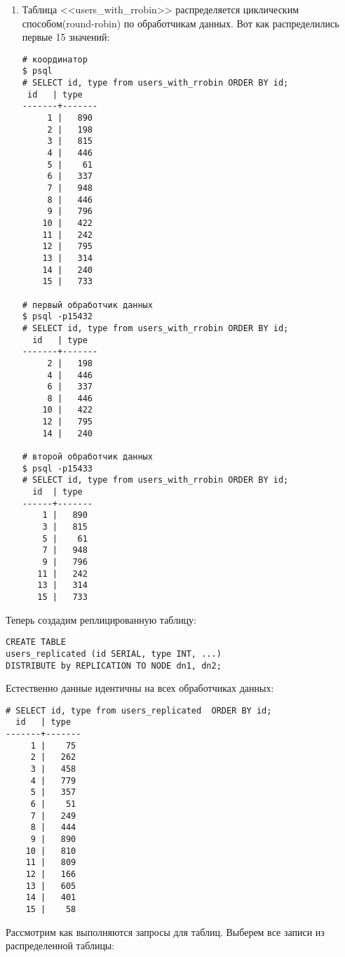 \begin{enumerate}
\item Таблица <<users\_with\_rrobin>> распределяется циклическим способом(round-robin) по обработчикам данных. Вот как распределились первые 15 значений:

\begin{lstlisting}[label=lst:postgres-xc5,caption=Данные с координатора и обработчиков данных]
# координатор
$ psql
# SELECT id, type from users_with_rrobin ORDER BY id;
 id   | type  
-------+-------
     1 |   890
     2 |   198
     3 |   815
     4 |   446
     5 |    61
     6 |   337
     7 |   948
     8 |   446
     9 |   796
    10 |   422
    11 |   242
    12 |   795
    13 |   314
    14 |   240
    15 |   733

# первый обработчик данных
$ psql -p15432
# SELECT id, type from users_with_rrobin ORDER BY id;
  id   | type  
-------+-------
     2 |   198
     4 |   446
     6 |   337
     8 |   446
    10 |   422
    12 |   795
    14 |   240

# второй обработчик данных
$ psql -p15433 
# SELECT id, type from users_with_rrobin ORDER BY id;
  id  | type  
------+-------
    1 |   890
    3 |   815
    5 |    61
    7 |   948
    9 |   796
   11 |   242
   13 |   314
   15 |   733
\end{lstlisting}

\end{enumerate}

Теперь создадим реплицированную таблицу:

\begin{lstlisting}[label=lst:postgres-xc20,caption=Создание реплицированной таблицы]
CREATE TABLE 
users_replicated (id SERIAL, type INT, ...) 
DISTRIBUTE by REPLICATION TO NODE dn1, dn2;
\end{lstlisting}

Естественно данные идентичны на всех обработчиках данных:

\begin{lstlisting}[label=lst:postgres-xc21,caption=Данные с координатора и обработчиков данных]
# SELECT id, type from users_replicated  ORDER BY id;
  id   | type  
-------+-------
     1 |    75
     2 |   262
     3 |   458
     4 |   779
     5 |   357
     6 |    51
     7 |   249
     8 |   444
     9 |   890
    10 |   810
    11 |   809
    12 |   166
    13 |   605
    14 |   401
    15 |    58
\end{lstlisting} 

Рассмотрим как выполняются запросы для таблиц. Выберем все записи из распределенной таблицы:

